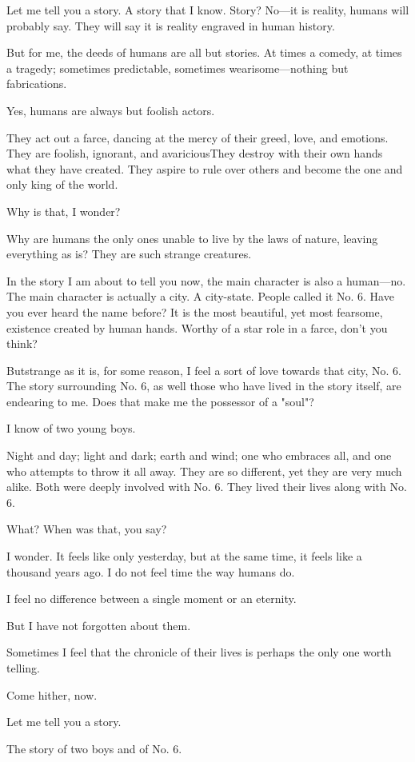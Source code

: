 
Let me tell you a story. A story that I know. Story? No---it is reality,
humans will probably say. They will say it is reality engraved in human
history.

But for me, the deeds of humans are all but stories. At times a comedy,
at times a tragedy; sometimes predictable, sometimes wearisome---nothing
but fabrications.

Yes, humans are always but foolish actors.

They act out a farce, dancing at the mercy of their greed, love, and
emotions. They are foolish, ignorant, and avaricious\el They destroy
with their own hands what they have created. They aspire to rule over
others and become the one and only king of the world.

Why is that, I wonder?

Why are humans the only ones unable to live by the laws of nature,
leaving everything as is? They are such strange creatures.

In the story I am about to tell you now, the main character is also a
human---no. The main character is actually a city. A city-state. People
called it No. 6. Have you ever heard the name before? It is the most
beautiful, yet most fearsome, existence created by human hands. Worthy
of a star role in a farce, don't you think?

But\el strange as it is, for some reason, I feel a sort of love towards
that city, No. 6. The story surrounding No. 6, as well those who have
lived in the story itself, are endearing to me. Does that make me the
possessor of a "soul"?

I know of two young boys.

Night and day; light and dark; earth and wind; one who embraces all, and
one who attempts to throw it all away. They are so different, yet they
are very much alike. Both were deeply involved with No. 6. They lived
their lives along with No. 6.

What? When was that, you say?

I wonder. It feels like only yesterday, but at the same time, it feels
like a thousand years ago. I do not feel time the way humans do.

I feel no difference between a single moment or an eternity.

But I have not forgotten about them.

Sometimes I feel that the chronicle of their lives is perhaps the only
one worth telling.

Come hither, now.

Let me tell you a story.

The story of two boys and of No. 6.